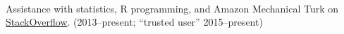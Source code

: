 \documentclass[12pt]{article}
\renewcommand{\section}[1]{\pagebreak[3]%
    \llap{\scshape\smash{\parbox[t]{\marginparwidth}{\raggedright {\color{lg}#1}}}}%
    \vspace{-\baselineskip}\par}
\newcommand{\topic}[1]{\pagebreak[3]\indent {\color{lg}{\footnotesize #1 }}\\}
\newcommand{\entry}[1]{\indent {\color{lg}\guillemotright}\hspace{2pt}#1\vspace{.25em}\\}
\begin{document}
	\topic{Miscellaneous}
		\entry{Assistance with statistics, R programming, and Amazon Mechanical Turk on \href{http://stackoverflow.com/users/2338862/thomas}{StackOverflow}. (2013--present; ``trusted user'' 2015--present)}
\end{document}
